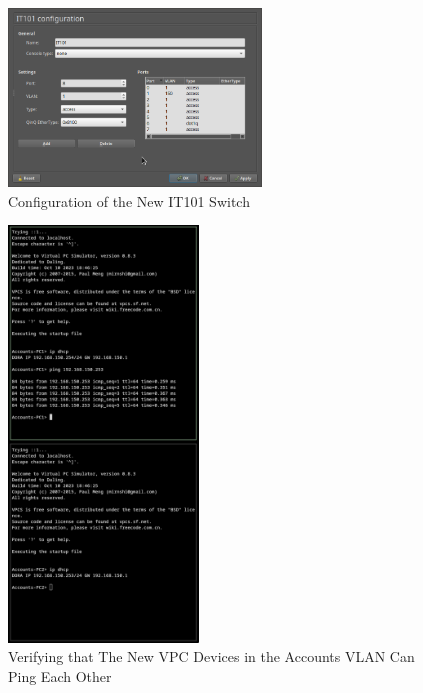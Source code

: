 \documentclass[a4paper]{article}
\begin{document}
\begin{figure}[H]
    \centering
    \includegraphics[width=0.6\textwidth]{./images/switch_conf.png}
    \caption{Configuration of the New IT101 Switch}
\end{figure}


\begin{figure}[H]
    \centering
    \includegraphics[width=0.45\textwidth]{./images/five.png}
    \caption{Verifying that The New VPC Devices in the Accounts VLAN Can Ping Each Other}
\end{figure}
\end{document}
